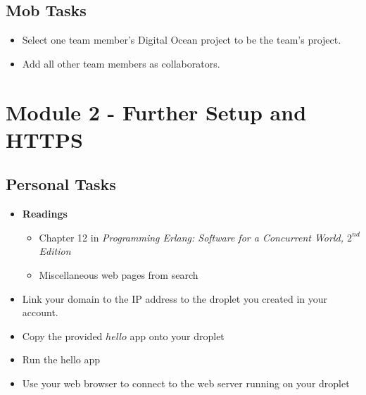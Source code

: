 \documentclass[12pt]{amsart}
\begin{document}
\subsection*{Mob Tasks}
	\begin{itemize}
		\item Select one team member's Digital Ocean project to be the team's project.
		\item Add all other team members as collaborators. 
	\end{itemize}
	\section*{Module 2 - Further Setup and HTTPS}
	\subsection*{Personal Tasks}
	\begin{itemize}
	\item \textbf{Readings}
	\begin{itemize}
		\item Chapter 12 in \textit{Programming Erlang: Software for a Concurrent World, $2^{nd}$ Edition}
		\item Miscellaneous web pages from search
	\end{itemize}
	\end{itemize}
	\begin{itemize}
		\item Link your domain to the IP address to the droplet you created in your account.
		\item Copy the provided $hello$ app onto your droplet
		\item Run the hello app
		\item Use your web browser to connect to the web server running on your droplet
	\end{itemize}
\end{document}
